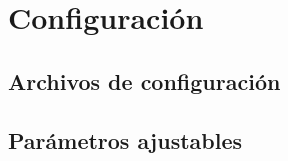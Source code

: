 	\section{Configuraci\'on}
	\subsection{Archivos de configuraci\'on}
	\subsection{Par\'ametros ajustables}